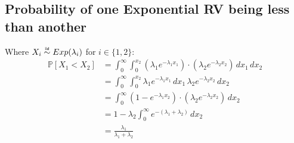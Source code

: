\documentclass[12pt]{report}
\newcommand\iid{\mathrel{\overset{\makebox[0pt]{\mbox{\normalfont\tiny\sffamily
iid}}}{\sim}}}
\begin{document}
\subsection{Probability of one Exponential RV being less than another}
Where $X_{i} \iid Exp(\lambda_{i})$ for $i \in \{1, 2\}$:
\begin{equation*}
    \begin{aligned}
        \mathbb{P}\left[X_{1} < X_{2}\right] &= \int_{0}^{\infty} \int_{0}^{x_{2}} \left( \lambda_{1}e^{-\lambda_{1}x_{1}} \right) \cdot \left( \lambda_{2}e^{-\lambda_{2}x_{2}} \right) \,dx_{1}  \,dx_{2}  \\
            &= \int_{0}^{\infty} \int_{0}^{x_{2}}  \lambda_{1}e^{-\lambda_{1}x_{1}} \,dx_{1} \, \lambda_{2}e^{-\lambda_{2}x_{2}}  \,dx_{2}  \\
            &= \int_{0}^{\infty} \left( 1 - e^{-\lambda_{1}x_{2}}\right) \cdot \left( \lambda_{2}e^{-\lambda_{2}x_{2}} \right) \,dx_{2}  \\
            &= 1 - \lambda_{2} \int_{0}^{\infty} e^{-(\lambda_{1} + \lambda_{2})} \,dx_{2} \\
            &= \frac{\lambda_{1}}{\lambda_{1} + \lambda_{2}} \\
    \end{aligned}
\end{equation*}
\end{document}
